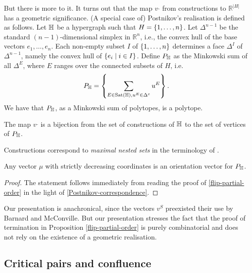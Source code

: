 But there is more to it. 
It turns out that the map $v^{\_}$ from constructions to $\mathbb{R}^{|H|}$
has a geometric significance.  
(A special case of) Postnikov's realisation is defined as follows. 
Let ${\mathbb H}$ be a hypergraph such that $H=\left\{1,\ldots,n\right\}$. 
Let $\Delta^{n-1}$ be the standard $(n-1)$-dimensional simplex in $\mathbb{R}^n$, i.e., the convex hull of the base vectors $e_1,\ldots,e_n$. 
Each non-empty subset $I$ of $\left\{1,\ldots,n\right\}$ determines a face $\Delta^I$ of $\Delta^{n-1}$, namely the convex hull of $\left\{e_i \mid i\in I\right\}$. 
Define $P_{{\mathbb H}}$ as the Minkowski sum of all $\Delta^E$, where $E$ ranges over the connected subsets of $H$, i.e.
$$P_{{\mathbb H}}=\left\{\sum_{E\in{\operatorname{Sat}}({\mathbb H}), u^E\in\Delta^e} u^E\right\}.$$
We have that $P_{{\mathbb H}}$, as a Minkowski sum of polytopes, is a polytope.

\begin{proposition}[{\cite[Prop.~7.9]{P09}}] \label{Postnikov-correspondence}
The map $v^{\_}$ is a bijection from the set of constructions of ${\mathbb H}$ to the set of vertices of $P_{{\mathbb H}}$.
\end{proposition}

\begin{rem}
  Constructions correspond to \emph{maximal nested sets} in the terminology of \cite{P09}.
\end{rem}

\begin{corollary} 
  \label{Tamari-orientation-vector}
  Any vector $\mu$ with strictly decreasing coordinates is an orientation vector for $P_{{\mathbb H}}$.
\end{corollary} 

\begin{proof}
The statement follows immediately from reading the proof of \cref{flip-partial-order} in the light of \cref{Postnikov-correspondence}.
\end{proof}

\begin{rem} 
  Our presentation is anachronical, since the vectors $v^S$ preexisted their use by Barnard and McConville. 
  But our presentation stresses the fact that the proof of termination in Proposition \ref{flip-partial-order} is purely combinatorial and does not rely on the existence of a geometric realisation.
\end{rem}


\subsection{Critical pairs and confluence}

